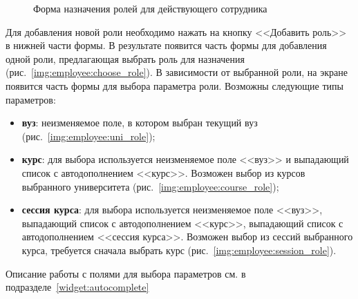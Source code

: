 \begin{figure}[H]
	\caption{Форма назначения ролей для действующего сотрудника}
	\label{img:employee:individual_form}
\end{figure}

Для добавления новой роли необходимо нажать на кнопку <<Добавить роль>> в нижней части формы. В результате появится часть формы для
добавления одной роли, предлагающая выбрать роль для назначения (рис.~\ref{img:employee:choose_role}). В зависимости от 
выбранной роли, на экране появится часть формы для выбора параметра роли. Возможны следующие типы параметров:
\begin{itemize}
	\item {\bf вуз}: неизменяемое поле, в котором выбран текущий вуз (рис.~\ref{img:employee:uni_role});
	\item {\bf курс}: для выбора используется неизменяемое поле <<вуз>> и выпадающий список с автодополнением <<курс>>. 
	Возможен выбор из курсов выбранного университета (рис.~\ref{img:employee:course_role});
	\item {\bf сессия курса}:  для выбора используется неизменяемое поле <<вуз>>, выпадающий список с автодополнением <<курс>>, выпадающий список с автодополнением <<сессия курса>>.  Возможен выбор из сессий выбранного курса, требуется сначала выбрать курс (рис.~\ref{img:employee:session_role}).
\end{itemize}

Описание работы с полями для выбора параметров см. в подразделе~\ref{widget:autocomplete}


